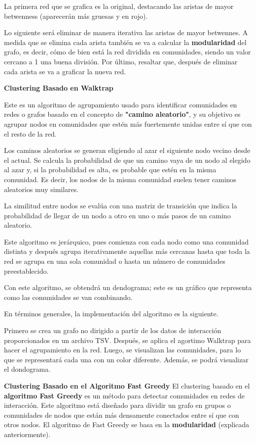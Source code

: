 La primera red que se grafica es la original, destacando las aristas de mayor betwenness (aparecerán más gruesas y en rojo).

Lo siguiente será eliminar de manera iterativa las aristas de mayor betwennes. A medida que se elimina cada arista también se va a calcular la \textbf{modularidad} del grafo, es decir, cómo de bien está la red dividida en comunidades, siendo un valor cercano a 1 una buena división. Por último, resaltar que, después de eliminar cada arista se va a graficar la nueva red.

\textbf{Clustering Basado en Walktrap}

Este es un algoritmo de agrupamiento usado para identificar comunidades en redes o grafos basado en el concepto de \textbf{"camino aleatorio"}, y su objetivo es agrupar nodos en comunidades que estén más fuertemente unidas entre sí que con el resto de la red.

Los caminos aleatorios se generan eligiendo al azar el siguiente nodo vecino desde el actual. Se calcula la probabilidad de que un camino vaya de un nodo al elegido al azar y, si la probabilidad es alta, es probable que estén en la misma comunidad. Es decir, los nodos de la misma comunidad suelen tener caminos aleatorios muy similares.

La similitud entre nodos se evalúa con una matriz de transición que indica la probabilidad de llegar de un nodo a otro en uno o más pasos de un camino aleatorio.

Este algoritmo es jerárquico, pues comienza con cada nodo como una comunidad distinta y después agrupa iterativamente aquellas más cercanas hasta que toda la red se agrupa en una sola comunidad o hasta un número de comunidades preestablecido. 

Con este algoritmo, se obtendrá un dendograma; este es un gráfico que representa como las comunidades se van combinando.

En términos generales, la implementación del algoritmo es la siguiente.

Primero se crea un grafo no dirigido a partir de los datos de interacción proporcionados en un archivo TSV. Después, se aplica el agortimo Walktrap para hacer el agrupamiento en la red. Luego, se visualizan las comunidades, para lo que se representará cada una con un color diferente. Además, se podrá visualizar el dondograma.

\textbf{Clustering Basado en el Algoritmo Fast Greedy}
El clustering basado en el \textbf{algoritmo Fast Greedy} es un método para detectar comunidades en redes de interacción. Este algoritmo está diseñado para dividir un grafo en grupos o comunidades de nodos que están más densamente conectados entre sí que con otros nodos. El algoritmo de Fast Greedy se basa en la \textbf{modularidad} (explicada anteriormente).

